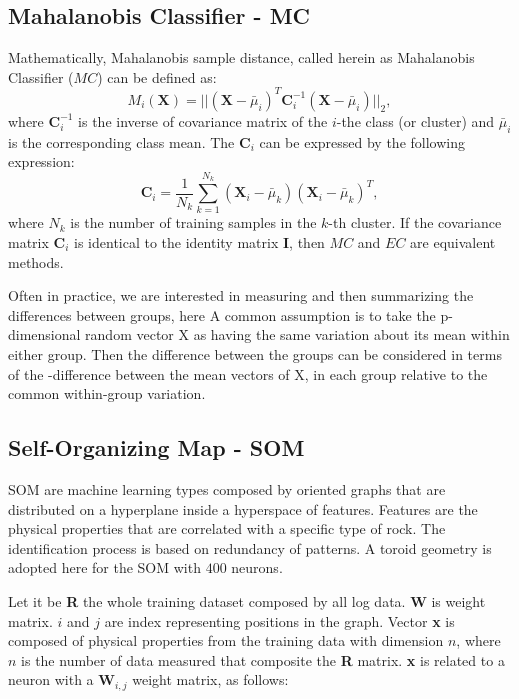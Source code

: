 \documentclass[preprint,12pt]{elsarticle}
\begin{document}
\subsection{Mahalanobis Classifier - MC}
\label{sub:MC}
Mathematically, Mahalanobis sample distance, called herein as Mahalanobis Classifier ($MC$) can be defined as:
\begin{equation}
M_{i}(\mathbf{X})=|| (\mathbf{X}-\bar{\mu}_{i})^{T} \mathbf{C}_{i}^{-1}(\mathbf{X}-\bar{\mu}_{i}) ||_2,
\label{eq:maha}
\end{equation}
where $\mathbf{C}_i^{-1}$ is the inverse of covariance matrix of the $i$-the class (or cluster) and $\bar{\mu}_i$ is the corresponding class mean. The $\mathbf{C}_i$  can be expressed by the following expression:
\begin{equation}
\textbf{C}_{i}=\frac{1}{N_{k}}\sum_{k=1}^{N_k}(\textbf{X}_i-\bar{\mu}_{k})(\textbf{X}_i-\bar{\mu}_{k})^{T},
\label{eq:covC}
\end{equation}
where $N_k$ is the number of training samples in the $k$-th cluster. If the covariance matrix $\textbf{C}_{i}$ is identical to the identity matrix $\textbf{I}$, then $MC$ and $EC$ are equivalent methods. 
 
Often in practice, we are interested in measuring and then summarizing the differences between groups, here  A common assumption is to take the p-dimensional random vector X as having the same variation about its mean within either group. Then the difference between the groups can be considered in terms of the -difference between the mean vectors of X, in each group relative to the common within-group variation.

\subsection{Self-Organizing Map - SOM}
\label{sub:SOM}
SOM are machine learning types composed by oriented graphs that are distributed on a hyperplane inside a hyperspace of features. Features are the physical properties that are correlated with a specific type of rock. The identification process is based on redundancy of patterns. A toroid geometry is adopted here for the SOM with $400$ neurons. 

Let it be \textbf{R} the whole training dataset composed by all log data. \textbf{W} is weight matrix. $i$ and $j$ are index representing positions in the graph. Vector \textbf{x} is composed of physical properties from the training data with dimension $n$, where $n$ is the number of data measured that composite the \textbf{R} matrix. \textbf{x} is related to a neuron with a $\textbf{W}_{i,j}$ weight matrix, as follows:
\end{document}
